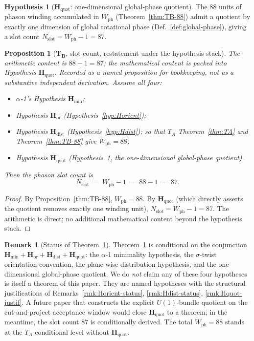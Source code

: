 \documentclass[11pt, a4paper]{amsart}
\newtheorem{proposition}[theorem]{Proposition}
\theoremstyle{definition}
\newtheorem{remark}[theorem]{Remark}
\newtheorem{hypothesis}[theorem]{Hypothesis}
\newcommand{\Hmin}{\mathbf{H}_{\min}}
\newcommand{\Hor}{\mathbf{H}_{\mathrm{or}}}
\newcommand{\Hdist}{\mathbf{H}_{\mathrm{dist}}}
\newcommand{\Hquot}{\mathbf{H}_{\mathrm{quot}}}
\newcommand{\Wph}{W_{\mathrm{ph}}}
\newcommand{\Nslot}{N_{\mathrm{slot}}}
\begin{document}
\begin{hypothesis}[$\Hquot$: one-dimensional global-phase
  quotient]
\label{hyp:Hquot}
The $88$ units of phason winding accumulated in
$\Wph$ (Theorem~\ref{thm:TB-88}) admit a quotient by exactly
one dimension of global rotational phase
(Def.~\ref{def:global-phase}), giving a slot count
$\Nslot = \Wph - 1 = 87$.
\end{hypothesis}

\begin{proposition}[$\mathbf{T_B}$, slot count, restatement under the hypothesis stack]
\label{thm:TB-87}
\emph{The arithmetic content is $88 - 1 = 87$; the mathematical
content is packed into Hypothesis $\Hquot$. Recorded as a named
proposition for bookkeeping, not as a substantive independent
derivation.} Assume all four:
\begin{itemize}
\item $\alpha$-1's Hypothesis $\Hmin$;
\item Hypothesis $\Hor$ (Hypothesis~\ref{hyp:Horient});
\item Hypothesis $\Hdist$ (Hypothesis~\ref{hyp:Hdist}); so
  that $T_A$ Theorem~\ref{thm:TA} and Theorem~\ref{thm:TB-88}
  give $\Wph = 88$;
\item Hypothesis $\Hquot$ (Hypothesis~\ref{hyp:Hquot}, the
  one-dimensional global-phase quotient).
\end{itemize}
Then the phason slot count is
\[
  \Nslot \;=\; \Wph - 1 \;=\; 88 - 1 \;=\; 87.
\]
\end{proposition}

\begin{proof}
By Proposition~\ref{thm:TB-88}, $\Wph = 88$. By $\Hquot$ (which
directly asserts the quotient removes exactly one winding unit),
$\Nslot = \Wph - 1 = 87$. The arithmetic is direct; no additional
mathematical content beyond the hypothesis stack.
\end{proof}

\begin{remark}[Status of Theorem~\ref{thm:TB-87}]
\label{rmk:TB-87-status}
Theorem~\ref{thm:TB-87} is conditional on the conjunction
$\Hmin + \Hor + \Hdist + \Hquot$: the $\alpha$-1 minimality
hypothesis, the $\sigma$-twist orientation convention, the
plane-wise distribution hypothesis, and the one-dimensional
global-phase quotient. We do
\emph{not} claim any of these four hypotheses is itself a
theorem of this paper. They are named hypotheses with the
structural justifications of Remarks~\ref{rmk:Horient-status},
\ref{rmk:Hdist-status}, \ref{rmk:Hquot-justif}.
A future paper that constructs the explicit
$U(1)$-bundle quotient on the cut-and-project acceptance
window would close $\Hquot$ to a theorem; in the meantime,
the slot count $87$ is conditionally derived. The total
$\Wph = 88$ stands at the $T_A$-conditional level without
$\Hquot$.
\end{remark}
\end{document}
